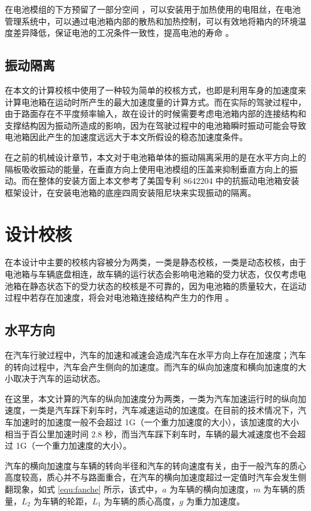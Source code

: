 在电池模组的下方预留了一部分空间 ，可以安装用于加热使用的电阻丝，在电池管理系统中，可以通过电池箱内部的散热和加热控制，可以有效地将箱内的环境温度差异降低，保证电池的工况条件一致性，提高电池的寿命 \cite{叶欣2017电动汽车锂离子电池散热加热设计}。

\subsection{振动隔离}
在本文的计算校核中使用了一种较为简单的校核方式，也即是利用车身的加速度来计算电池箱在运动时所产生的最大加速度量的计算方式。而在实际的驾驶过程中，由于路面存在不平度频率输入，故在设计的时候需要考虑电池箱内部的连接结构和支撑结构因为振动所造成的影响，因为在驾驶过程中的电池箱瞬时振动可能会导致电池箱因此产生的加速度远远大于本文所假设的稳态加速度条件。

在之前的机械设计章节，本文对于电池箱单体的振动隔离采用的是在水平方向上的隔板吸收振动的能量，在垂直方向上使用电池模组的压盖来抑制垂直方向上的振动。而在整体的安装方面上本文参考了美国专利 8642204 中的抗振动电池箱安装框架设计，在安装电池箱的底座四周安装阻尼块来实现振动的隔离。

\section{设计校核}

在本设计中主要的校核内容被分为两类，一类是静态校核，一类是动态校核，由于电池箱与车辆底盘相连，故车辆的运行状态会影响电池箱的受力状态，仅仅考虑电池箱在静态状态下的受力状态的校核是不可靠的，因为电池箱的质量较大，在运动过程中若存在加速度，将会对电池箱连接结构产生力的作用 \cite{王文伟2016电动汽车电池箱结构随机振动疲劳分析}。

\subsection{水平方向}
在汽车行驶过程中，汽车的加速和减速会造成汽车在水平方向上存在加速度；汽车的转向过程中，汽车会产生侧向的加速度。而汽车的纵向加速度和横向加速度的大小取决于汽车的运动状态。

在这里，本文计算的汽车的纵向加速度分为两类，一类为汽车加速运行时的纵向加速度，一类是汽车踩下刹车时，汽车减速运动的加速度。在目前的技术情况下，汽车加速时的加速度一般不会超过 1G（一个重力加速度的大小），该加速度的大小相当于百公里加速时间 2.8 秒，而当汽车踩下刹车时，车辆的最大减速度也不会超过 1G（一个重力加速度的大小）。

汽车的横向加速度与车辆的转向半径和汽车的转向速度有关，由于一般汽车的质心高度较高，质心并不与路面重合，在汽车的横向加速度超过一定值时汽车会发生侧翻现象，如式 \ref{equ:fanche} 所示，该式中，$a$ 为车辆的横向加速度，$m$ 为车辆的质量，$L_2$ 为车辆的轮距，$L_1$ 为车辆的质心高度，$g$ 为重力加速度。

